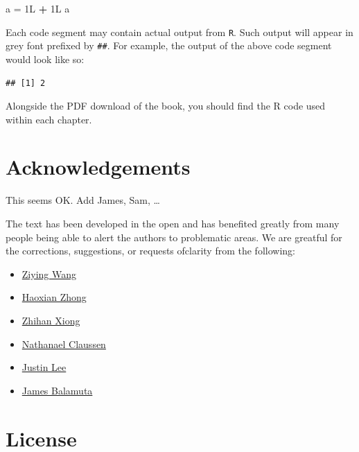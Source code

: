 \documentclass[]{book}
\newenvironment{Shaded}{\begin{snugshade}}{\end{snugshade}}
\newcommand{\NormalTok}[1]{#1}
\newcommand{\OperatorTok}[1]{\textcolor[rgb]{0.81,0.36,0.00}{\textbf{#1}}}
\newcommand{\StringTok}[1]{\textcolor[rgb]{0.31,0.60,0.02}{#1}}
\providecommand{\tightlist}{%
  \setlength{\itemsep}{0pt}\setlength{\parskip}{0pt}}
\theoremstyle{definition}
\theoremstyle{definition}
\theoremstyle{definition}
\theoremstyle{remark}
\begin{document}
\begin{Shaded}
\begin{Highlighting}[]
\NormalTok{a =}\StringTok{ }\NormalTok{1L }\OperatorTok{+}\StringTok{ }\NormalTok{1L}
\NormalTok{a}
\end{Highlighting}
\end{Shaded}

Each code segment may contain actual output from \texttt{R}. Such output
will appear in grey font prefixed by \texttt{\#\#}. For example, the
output of the above code segment would look like so:

\begin{verbatim}
## [1] 2
\end{verbatim}

Alongside the PDF download of the book, you should find the R code used
within each chapter.

\hypertarget{acknowledgements}{%
\section{Acknowledgements}\label{acknowledgements}}

\begin{rmdcomment}
This seems OK. Add James, Sam, \ldots{}
\end{rmdcomment}

The text has been developed in the open and has benefited greatly from
many people being able to alert the authors to problematic areas. We are
greatful for the corrections, suggestions, or requests ofclarity from
the following:

\begin{itemize}
\tightlist
\item
  \href{https://github.com/zionward}{Ziying Wang}
\item
  \href{https://github.com/Lyle-Haoxian}{Haoxian Zhong}
\item
  \href{https://www.linkedin.com/in/zhihan-xiong-988152114}{Zhihan
  Xiong}
\item
  \href{https://github.com/Nathanael-Claussen}{Nathanael Claussen}
\item
  \href{https:://github.com/munsheet}{Justin Lee}
\item
  \href{https::/github.com/coatless}{James Balamuta}
\end{itemize}

\hypertarget{license}{%
\section{License}\label{license}}
\end{document}
